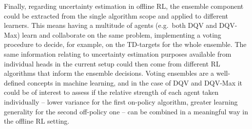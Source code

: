Finally, regarding uncertainty estimation in offline RL, the ensemble
component could be extracted from the single algorithm scope and
applied to different learners. This means having a multitude of agents
(e.g.\ both DQV and DQV-Max) learn and collaborate on the same
problem, implementing a voting procedure to decide, for example, on
the TD-targets for the whole ensemble. The same information
relating to uncertainty estimation purposes available from individual
heads in the current setup could then come from different RL
algorithms that inform the ensemble decisions. Voting ensembles are a
well-defined concepts in machine learning, and in the case of DQV and
DQV-Max it could be of interest to assess if the relative strength of
each agent taken individually -- lower variance for the first
on-policy algorithm, greater learning generality for the second
off-policy one -- can be combined in a meaningful way in the offline
RL setting.
